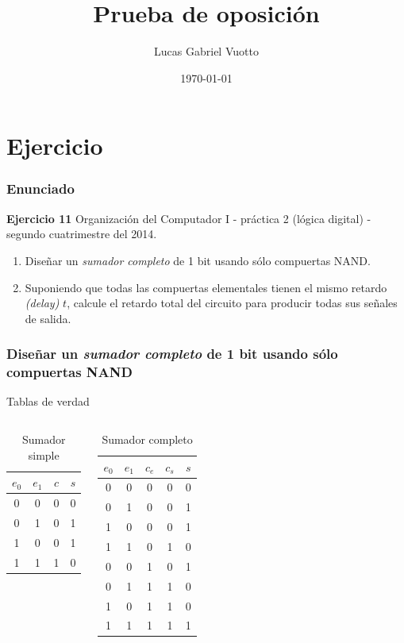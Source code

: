 \documentclass[mathserif,hyperref]{beamer}
\title{Prueba de oposición}
\author{Lucas Gabriel Vuotto}
\date{\today}
\begin{document}
\section{Ejercicio}

\begin{frame}
\frametitle{Enunciado}
\textbf{Ejercicio 11}
{\tiny Organización del Computador I - práctica 2 (lógica digital) - segundo
cuatrimestre del 2014.}
\begin{enumerate}
  \item Diseñar un \textit{sumador completo} de 1 bit usando sólo compuertas
  NAND.
  \item Suponiendo que todas las compuertas elementales tienen el mismo
  retardo \textit{(delay)} $t$, calcule el retardo total del circuito para
  producir todas sus señales de salida.
\end{enumerate}
\end{frame}


\begin{frame}
\frametitle{\small Diseñar un \textit{sumador completo} de 1 bit usando sólo
compuertas NAND}
Tablas de verdad
\begin{columns}
    \begin{center}\begin{table}
    \begin{tabular}{| c | c || c | c |}
      \hline
      $e_0$ & $e_1$ & $c$ & $s$ \\ \hline
        0   &   0   &  0  &  0  \\
        0   &   1   &  0  &  1  \\
        1   &   0   &  0  &  1  \\
        1   &   1   &  1  &  0  \\
      \hline
    \end{tabular}
    \caption*{Sumador simple}
    \end{table}\end{center}
    \begin{center}\begin{table}
    \begin{tabular}{| c | c | c || c | c |}
      \hline
      $e_0$ & $e_1$ & $c_e$ & $c_s$ & $s$ \\ \hline
        0   &   0   &   0   &   0   &  0  \\
        0   &   1   &   0   &   0   &  1  \\
        1   &   0   &   0   &   0   &  1  \\
        1   &   1   &   0   &   1   &  0  \\
        0   &   0   &   1   &   0   &  1  \\
        0   &   1   &   1   &   1   &  0  \\
        1   &   0   &   1   &   1   &  0  \\
        1   &   1   &   1   &   1   &  1  \\
      \hline
    \end{tabular}
    \caption*{Sumador completo}
    \end{table}\end{center}
\end{columns}
\end{frame}
\end{document}
